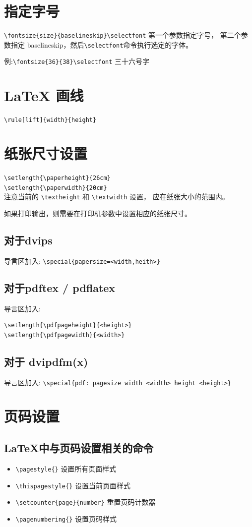 \documentclass[a4paper,11pt]{article}
\begin{document}
\section{指定字号}
\verb+\fontsize{size}{baselineskip}\selectfont+ 第一个参数指定字号，
第二个参数指定 baselineskip，然后\verb+\selectfont+命令执行选定的字体。

例:\verb+\fontsize{36}{38}\selectfont+
{\fontsize{36}{38}\selectfont 三十六号字}

\section{\LaTeX{} 画线}
\verb+\rule[lift]{width}{height}+

\section{纸张尺寸设置}
\verb+\setlength{\paperheight}{26cm}+\\
\verb+\setlength{\paperwidth}{20cm}+\\

注意当前的 \verb+\textheight+ 和 \verb+\textwidth+ 设置，
应在纸张大小的范围内。

如果打印输出，则需要在打印机参数中设置相应的纸张尺寸。

\subsection{对于dvips}
导言区加入: \verb+\special{papersize=<width,heith>}+

\subsection{对于pdftex / pdflatex}
导言区加入: 
\begin{Verbatim}
\setlength{\pdfpageheight}{<height>} 
\setlength{\pdfpagewidth}{<width>} 
\end{Verbatim}

\subsection{对于 dvipdfm(x)}
导言区加入: \verb+\special{pdf: pagesize width <width> height <height>}+

\section{页码设置}
\subsection{\LaTeX 中与页码设置相关的命令}
\begin{itemize}
	\item \verb+\pagestyle{}+ 设置所有页面样式
	\item \verb+\thispagestyle{}+ 设置当前页面样式
	\item \verb+\setcounter{page}{number}+ 重置页码计数器
	\item \verb+\pagenumbering{}+ 设置页码样式
\end{itemize}
\end{document}
